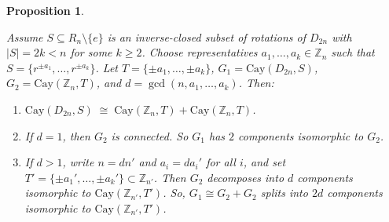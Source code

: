 \documentclass[10pt,a4paper]{amsart}
\newtheorem{prop}{Proposition}
\begin{document}
\begin{prop}\label{Proposition 3.1}
{\em
Assume $S\subseteq R_{n}\setminus\{e\}$ is an inverse-closed subset of rotations of $D_{2n}$ with $|S|=2k<n$ for some $k\ge2$.  
Choose representatives $a_1,\dots,a_k\in\mathbb{Z}_n$ such that 
$S=\{r^{\pm a_1},\dots,r^{\pm a_k}\}$.
Let $T = \{\pm a_1, \dots, \pm a_k\}$, 
$G_{1} = \mathrm{Cay}(D_{2n}, S)$, 
$G_{2} = \mathrm{Cay}(\mathbb{Z}_n, T)$, and $d = \gcd(n, a_1, \dots, a_k)$. Then:
\begin{enumerate}
  \item $\mathrm{Cay}(D_{2n}, S) \;\cong\; \mathrm{Cay}(\mathbb{Z}_n, T) + \mathrm{Cay}(\mathbb{Z}_n, T)$.
  
  \item If $d = 1$, then $G_{2}$ is connected. So $G_{1}$ has $2$ components isomorphic to $G_{2}$.
  
  \item If $d > 1$, write $n = d n'$ and $a_i = d a_i'$ for all $i$, and set 
  $T' = \{\pm a_1', \dots, \pm a_k'\} \subset \mathbb{Z}_{n'}$. 
  Then $G_{2}$ decomposes into $d$ components isomorphic to $\mathrm{Cay}(\mathbb{Z}_{n'}, T')$. 
  So, $G_{1} \cong G_{2} + G_{2}$ splits into $2d$ components isomorphic to $\mathrm{Cay}(\mathbb{Z}_{n'}, T')$.
\end{enumerate}
}
\end{prop}
\end{document}
